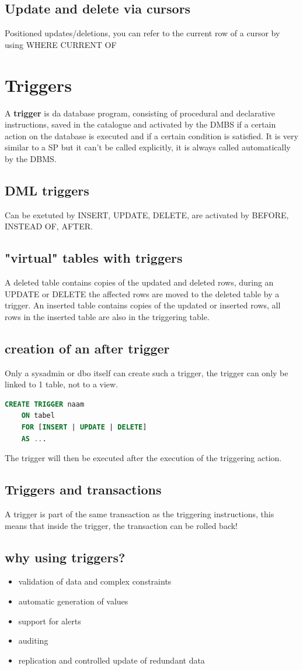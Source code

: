 \documentclass{report}
\begin{document}
	\subsection{Update and delete via cursors}
	Positioned updates/deletions, you can refer to the current row of a cursor by using WHERE CURRENT OF
	\section{Triggers}
	A \textbf{trigger} is da database program, consisting of procedural and declarative instructions, saved in the catalogue and activated by the DMBS if a certain action on the database is executed and if a certain condition is satisfied. It is very similar to a SP but it can't be called explicitly, it is always called automatically by the DBMS.
	\subsection{DML triggers}
	Can be exetuted by INSERT, UPDATE, DELETE, are activated by BEFORE, INSTEAD OF, AFTER.
	\subsection{"virtual" tables with triggers}
	A deleted table contains copies of the updated and deleted rows, during an UPDATE or DELETE the affected rows are moved to the deleted table by a trigger. An inserted table contains copies of the updated or inserted rows, all rows in the inserted table are also in the triggering table. 
	\subsection{creation of an after trigger}
	Only a sysadmin or dbo itself can create such a trigger, the trigger can only be linked to 1 table, not to a view. 
	\begin{lstlisting}[language=sql]
	CREATE TRIGGER naam
	ON tabel
	FOR [INSERT | UPDATE | DELETE]
	AS ... \end{lstlisting}
	The trigger will then be executed after the execution of the triggering action.
	\subsection{Triggers and transactions}
	A trigger is part of the same transaction as the triggering instructions, this means that inside the trigger, the transaction can be rolled back!
	\subsection{why using triggers?}
	\begin{itemize}
		\item validation of data and complex constraints 
		\item automatic generation of values
		\item support for alerts
		\item auditing
		\item replication and controlled update of redundant data
	\end{itemize}
\end{document}
